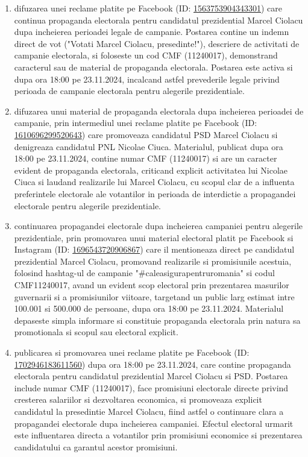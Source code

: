 \documentclass[a4paper,12pt]{article}
\begin{document}
\begin{enumerate}[leftmargin=*, label=\arabic*.)]
    \item difuzarea unei reclame platite pe Facebook (ID: \href{https://www.facebook.com/ads/library/?id=1563753904343301}{1563753904343301}) care continua propaganda electorala pentru candidatul prezidential Marcel Ciolacu dupa incheierea perioadei legale de campanie. Postarea contine un indemn direct de vot ("Votati Marcel Ciolacu, presedinte!"), descriere de activitati de campanie electorala, si foloseste un cod CMF (11240017), demonstrand caracterul sau de material de propaganda electorala. Postarea este activa si dupa ora 18:00 pe 23.11.2024, incalcand astfel prevederile legale privind perioada de campanie electorala pentru alegerile prezidentiale.
    \item difuzarea unui material de propaganda electorala dupa incheierea perioadei de campanie, prin intermediul unei reclame platite pe Facebook (ID: \href{https://www.facebook.com/ads/library/?id=1610696299520643}{1610696299520643}) care promoveaza candidatul PSD Marcel Ciolacu si denigreaza candidatul PNL Nicolae Ciuca. Materialul, publicat dupa ora 18:00 pe 23.11.2024, contine numar CMF (11240017) si are un caracter evident de propaganda electorala, criticand explicit activitatea lui Nicolae Ciuca si laudand realizarile lui Marcel Ciolacu, cu scopul clar de a influenta preferintele electorale ale votantilor in perioada de interdictie a propagandei electorale pentru alegerile prezidentiale.
    \item continuarea propagandei electorale dupa incheierea campaniei pentru alegerile prezidentiale, prin promovarea unui material electoral platit pe Facebook si Instagram (ID: \href{https://www.facebook.com/ads/library/?id=1696543720906867}{1696543720906867}) care il mentioneaza direct pe candidatul prezidential Marcel Ciolacu, promovand realizarile si promisiunile acestuia, folosind hashtag-ul de campanie "\#caleasigurapentruromania" si codul CMF11240017, avand un evident scop electoral prin prezentarea masurilor guvernarii si a promisiunilor viitoare, targetand un public larg estimat intre 100.001 si 500.000 de persoane, dupa ora 18:00 pe 23.11.2024. Materialul depaseste simpla informare si constituie propaganda electorala prin natura sa promotionala si scopul sau electoral explicit.
    \item publicarea si promovarea unei reclame platite pe Facebook (ID: \href{https://www.facebook.com/ads/library/?id=1702946183611560}{1702946183611560}) dupa ora 18:00 pe 23.11.2024, care contine propaganda electorala pentru candidatul prezidential Marcel Ciolacu si PSD. Postarea include numar CMF (11240017), face promisiuni electorale directe privind cresterea salariilor si dezvoltarea economica, si promoveaza explicit candidatul la presedintie Marcel Ciolacu, fiind astfel o continuare clara a propagandei electorale dupa incheierea campaniei. Efectul electoral urmarit este influentarea directa a votantilor prin promisiuni economice si prezentarea candidatului ca garantul acestor promisiuni.

\end{enumerate}
\end{document}
